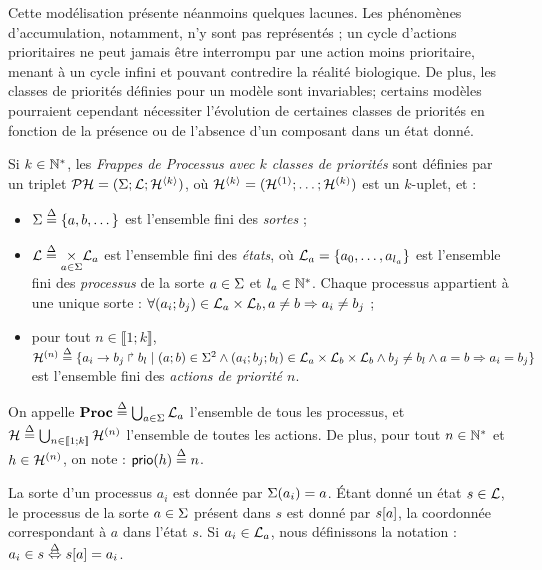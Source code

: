 Cette modélisation présente néanmoins quelques lacunes.
Les phénomènes d'accumulation, notamment, n'y sont pas représentés ;
un cycle d'actions prioritaires ne peut jamais être interrompu par une action moins prioritaire,
menant à un cycle infini et pouvant contredire la réalité biologique.
De plus, les classes de priorités définies pour un modèle sont invariables;
certains modèles pourraient cependant nécessiter l'évolution de certaines classes de priorités
en fonction de la présence ou de l'absence d'un composant dans un état donné.

\begin{definition}
\label{def:php}
  Si $k \in \mathbb{N}^*$, les \emph{Frappes de Processus avec $k$ classes de priorités} sont définies
  par un triplet $\mathcal{PH} = (\Sigma; \mathcal{L}; \mathcal{H}^{\langle k \rangle})$,
  où $\mathcal{H}^{\langle k \rangle} = (\mathcal{H}^{(1)}; \dots; \mathcal{H}^{(k)})$ est un $k$-uplet, et :
  \begin{itemize}
    \item $\Sigma \stackrel{\Delta}= \{a, b, \dots\}$ est l'ensemble fini des \emph{sortes} ;
    \item $\mathcal{L} \stackrel{\Delta}= \underset{a \in \Sigma}{\times} \mathcal{L}_a$ est l'ensemble fini des \emph{états},
      où $\mathcal{L}_a = \{a_0, \ldots, a_{l_a}\}$ est l'ensemble fini des \emph{processus} de la sorte
      $a \in \Sigma$ et $l_a \in \mathbb{N}^*$.
      Chaque processus appartient à une unique sorte :
      $\forall (a_i; b_j) \in \mathcal{L}_a \times \mathcal{L}_b, a \neq b \Rightarrow a_i \neq b_j$ ;
    \item pour tout $n \in \llbracket 1; k \rrbracket$,
      $\mathcal{H}^{(n)} \stackrel{\Delta}= \{a_i\rightarrow b_j\Rsh b_l \mid (a; b) \in \Sigma^2 \wedge
      (a_i; b_j; b_l) \in \mathcal{L}_a \times \mathcal{L}_b \times \mathcal{L}_b \wedge
      b_j \neq b_l \wedge a = b \Rightarrow a_i = b_j \}$ est l'ensemble fini 
      des \emph{actions de priorité $n$}.
  \end{itemize}
  On appelle $\mathbf{Proc} \stackrel{\Delta}= \bigcup_{a \in \Sigma} \mathcal{L}_a$ l'ensemble de tous les processus,
  et $\mathcal{H} \stackrel{\Delta}= \bigcup_{n \in \llbracket 1; k \rrbracket} \mathcal{H}^{(n)}$ l'ensemble de toutes les actions.
  De plus, pour tout $n \in \mathbb{N}^*$ et $h \in \mathcal{H}^{(n)}$, on note : $\mathsf{prio}(h) \stackrel{\Delta}= n$.
\end{definition}
%
\noindent
La sorte d'un processus $a_i$ est donnée par $\Sigma(a_i) = a$.
Étant donné un état $s \in \mathcal{L}$, le processus de la sorte $a \in \Sigma$ présent dans $s$ est donné
par ${s[a]}$, \cad la coordonnée correspondant à $a$ dans l'état $s$.
Si $a_i \in \mathcal{L}_a$, nous définissons la notation : $a_i \in s \stackrel{\Delta}\Leftrightarrow {s[a]} = a_i$.

